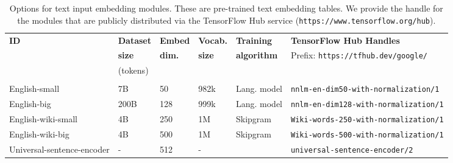 \documentclass{article}
\begin{document}
\begin{table*}[ht]
\centering
\begin{adjustbox}{max width=\textwidth}
\begin{tabular}{llllll}
\bf ID & \bf Dataset &\bf Embed & \bf Vocab. & \bf Training & \bf
TensorFlow Hub Handles \\
\bf  & \bf  size & \bf dim. & \bf size & \bf algorithm &
Prefix: \texttt{https://tfhub.dev/google/}\\
& (tokens) & & & \\
\hline \\
English-small  & 7B & 50 & 982k & Lang. model &
\texttt{nnlm-en-dim50-with-normalization/1} \\
English-big & 200B & 128 & 999k & Lang. model &
\texttt{nnlm-en-dim128-with-normalization/1} \\
English-wiki-small & 4B & 250 & 1M & Skipgram &
\texttt{Wiki-words-250-with-normalization/1} \\
English-wiki-big & 4B & 500 & 1M & Skipgram &
\texttt{Wiki-words-500-with-normalization/1} \\
Universal-sentence-encoder & - & 512 & - & \citep{cer2018universal} &
\texttt{universal-sentence-encoder/2} \\
\end{tabular}
\end{adjustbox}
\caption{Options for text input embedding modules.
These are pre-trained text embedding tables.
We provide the handle for the modules that are publicly distributed via the TensorFlow Hub service (\texttt{https://www.tensorflow.org/hub}).}
\label{tab:hub_embeddings_text}
\end{table*}
\end{document}
